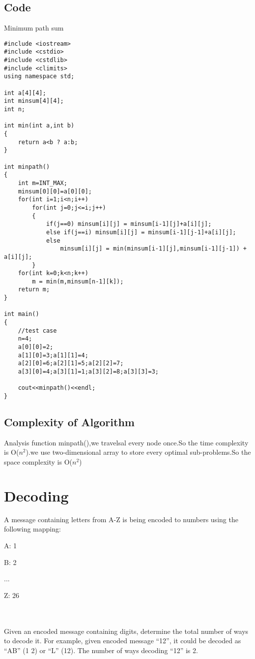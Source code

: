 \documentclass[]{article}
\begin{document}
\subsection{Code}
\begin{algorithm}[H]
\caption{Minimum path sum}
\begin{lstlisting}
#include <iostream>
#include <cstdio>
#include <cstdlib>
#include <climits>
using namespace std;

int a[4][4];
int minsum[4][4];
int n;

int min(int a,int b)
{
	return a<b ? a:b;
}

int minpath()
{
	int m=INT_MAX; 
	minsum[0][0]=a[0][0];
	for(int i=1;i<n;i++)
		for(int j=0;j<=i;j++)
		{
			if(j==0) minsum[i][j] = minsum[i-1][j]+a[i][j];
			else if(j==i) minsum[i][j] = minsum[i-1][j-1]+a[i][j];
			else
				minsum[i][j] = min(minsum[i-1][j],minsum[i-1][j-1]) + a[i][j];
		}
	for(int k=0;k<n;k++)
		m = min(m,minsum[n-1][k]);
	return m;
}

int main()
{
	//test case
	n=4;
	a[0][0]=2;
	a[1][0]=3;a[1][1]=4;
	a[2][0]=6;a[2][1]=5;a[2][2]=7;
	a[3][0]=4;a[3][1]=1;a[3][2]=8;a[3][3]=3;

	cout<<minpath()<<endl;
}
\end{lstlisting}
\end{algorithm}
\subsection{Complexity of Algorithm}
Analysis function minpath(),we travelsal every node once.So the time complexity is O($n^2$).we use two-dimensional array to store every optimal sub-problems.So the
space complexity is O($n^2$)


\section{Decoding}
A message containing letters from A-Z is being encoded to numbers using the following mapping:\\
\centerline{A: 1}
\centerline{B: 2}
\centerline{...}
\centerline{Z: 26}\\\\
Given an encoded message containing digits, determine the total number
of ways to decode it.
For example, given encoded message “12”, it could be decoded as “AB”
(1 2) or “L” (12). The number of ways decoding “12” is 2.
\end{document}
